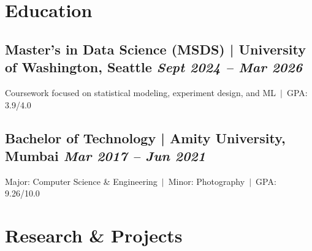 \documentclass[10pt,a4paper]{article}
\begin{document}
\section*{Education}
\subsection{Master's in Data Science (MSDS) | University of Washington, Seattle \hfill
\textit{Sept 2024 -- Mar 2026}}
Coursework focused on statistical modeling, experiment design, and ML\ $|$\ GPA: 3.9/4.0

\subsection{Bachelor of Technology | Amity University, Mumbai \hfill
\textit{Mar 2017 -- Jun 2021}}
Major: Computer Science \& Engineering\ $|$\ Minor: Photography\ $|$\ GPA: 9.26/10.0

\section*{Research \& Projects}


\end{document}
